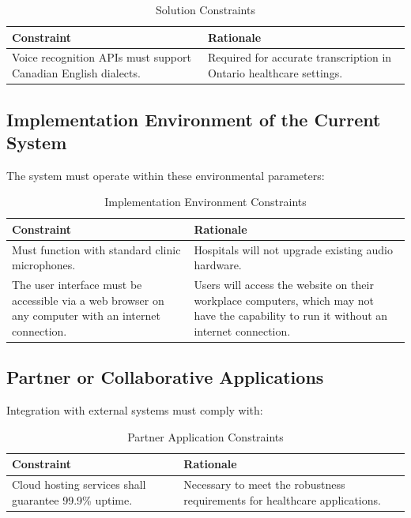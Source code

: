 \documentclass[12pt]{article}
\begin{document}
\begin{table}[H]
\centering
\begin{tabular}{|p{6cm}|p{6cm}|}
\hline
\textbf{Constraint} & \textbf{Rationale} \\
\hline
Voice recognition APIs must support Canadian English dialects. & Required for accurate transcription in Ontario healthcare settings. \\
\hline
\end{tabular}
\caption{Solution Constraints}
\label{tab:solution_constraints}
\end{table}

\subsection{Implementation Environment of the Current System}
The system must operate within these environmental parameters:

\begin{table}[H]
\centering
\begin{tabular}{|p{6cm}|p{6cm}|}
\hline
\textbf{Constraint} & \textbf{Rationale} \\
\hline
Must function with standard clinic microphones. & Hospitals will not upgrade existing audio hardware. \\
\hline
The user interface must be accessible via a web browser on any computer with an internet connection. & Users will access the website on their workplace computers, which may not have the capability to run it without an internet connection. \\
\hline
\end{tabular}
\caption{Implementation Environment Constraints}
\label{tab:implementation_constraints}
\end{table}

\subsection{Partner or Collaborative Applications}
Integration with external systems must comply with:

\begin{table}[H]
\centering
\begin{tabular}{|p{6cm}|p{6cm}|}
\hline
\textbf{Constraint} & \textbf{Rationale} \\
\hline
Cloud hosting services shall guarantee 99.9\% uptime. & Necessary to meet the robustness requirements for healthcare applications. \\
\hline
\end{tabular}
\caption{Partner Application Constraints}
\label{tab:partner_constraints}
\end{table}
\end{document}
